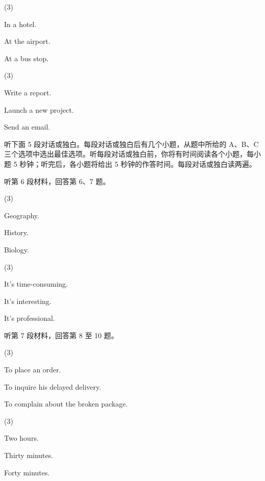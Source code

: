 \documentclass{英语试卷}
\begin{document}
\begin{choices}(3)
  \item In a hotel.
  \item At the airport.
  \item At a bus stop.
\end{choices}
\begin{choices}(3)
  \item Write a report.
  \item Launch a new project.
  \item Send an email.
\end{choices}
\par 听下面 5 段对话或独白。每段对话或独白后有几个小题，从题中所给的 A、B、C 三个选项中选出最佳选项。听每段对话或独白前，你将有时间阅读各个小题，每小题 5 秒钟；听完后，各小题将给出 5 秒钟的作答时间。每段对话或独白读两遍。\par
\par 听第 6 段材料，回答第 6、7 题。\par
{}
\begin{choices}(3)
  \item Geography.
  \item History.
  \item Biology.
\end{choices}
\begin{choices}(3)
  \item It's time-consuming.
  \item It's interesting.
  \item It's professional.
\end{choices}
\par 听第 7 段材料，回答第 8 至 10 题。\par
{}
\begin{choices}(3)
  \item To place an order.
  \item To inquire his delayed delivery.
  \item To complain about the broken package.
\end{choices}
\begin{choices}(3)
  \item Two hours.
  \item Thirty minutes.
  \item Forty minutes.
\end{choices}
\end{document}
